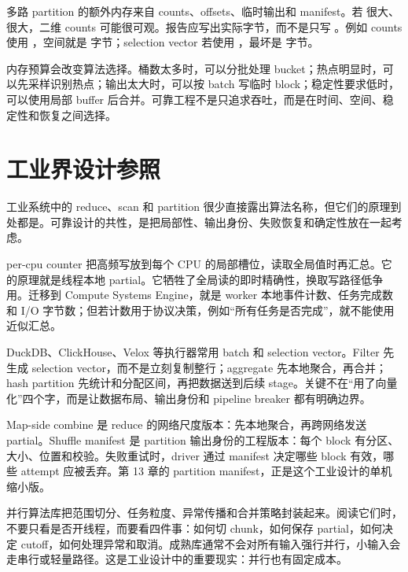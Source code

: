 多路 partition 的额外内存来自 counts、offsets、临时输出和 manifest。若  很大、 很大，二维 counts 可能很可观。报告应写出实际字节，而不是只写 。例如 counts 使用 ，空间就是  字节；selection vector 若使用 ，最坏是  字节。

内存预算会改变算法选择。桶数太多时，可以分批处理 bucket；热点明显时，可以先采样识别热点；输出太大时，可以按 batch 写临时 block；稳定性要求低时，可以使用局部 buffer 后合并。可靠工程不是只追求吞吐，而是在时间、空间、稳定性和恢复之间选择。

\section{工业界设计参照}

工业系统中的 reduce、scan 和 partition 很少直接露出算法名称，但它们的原理到处都是。可靠设计的共性，是把局部性、输出身份、失败恢复和确定性放在一起考虑。

per-cpu counter 把高频写放到每个 CPU 的局部槽位，读取全局值时再汇总。它的原理就是线程本地 partial。它牺牲了全局读的即时精确性，换取写路径低争用。迁移到 Compute Systems Engine，就是 worker 本地事件计数、任务完成数和 I/O 字节数；但若计数用于协议决策，例如“所有任务是否完成”，就不能使用近似汇总。

DuckDB、ClickHouse、Velox 等执行器常用 batch 和 selection vector。Filter 先生成 selection vector，而不是立刻复制整行；aggregate 先本地聚合，再合并；hash partition 先统计和分配区间，再把数据送到后续 stage。关键不在“用了向量化”四个字，而是让数据布局、输出身份和 pipeline breaker 都有明确边界。

Map-side combine 是 reduce 的网络尺度版本：先本地聚合，再跨网络发送 partial。Shuffle manifest 是 partition 输出身份的工程版本：每个 block 有分区、大小、位置和校验。失败重试时，driver 通过 manifest 决定哪些 block 有效，哪些 attempt 应被丢弃。第 13 章的 partition manifest，正是这个工业设计的单机缩小版。

并行算法库把范围切分、任务粒度、异常传播和合并策略封装起来。阅读它们时，不要只看是否开线程，而要看四件事：如何切 chunk，如何保存 partial，如何决定 cutoff，如何处理异常和取消。成熟库通常不会对所有输入强行并行，小输入会走串行或轻量路径。这是工业设计中的重要现实：并行也有固定成本。

